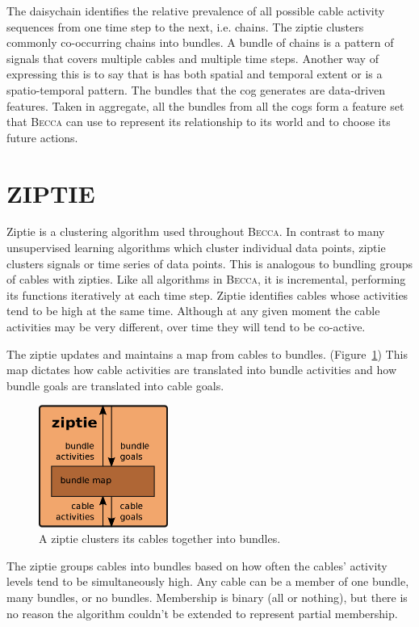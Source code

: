 \documentclass[oneside,twocolumn]{article}
\begin{document}
The daisychain identifies the relative prevalence of all possible cable activity sequences from one time step to the next, i.e. chains. The ziptie clusters commonly co-occurring chains into bundles. A bundle of chains is a pattern of signals that covers multiple cables and multiple time steps. Another way of expressing this is to say that is has both spatial and temporal extent or is a spatio-temporal pattern. The bundles that the cog generates are data-driven features. Taken in aggregate, all the bundles from all the cogs form a feature set that \textsc{Becca} can use to represent its relationship to its world and to choose its future actions. 

\section*{\color{copper} ZIPTIE}

Ziptie is a clustering algorithm used throughout \textsc{Becca}. In contrast to many unsupervised learning algorithms which cluster individual data points, ziptie clusters signals or time series of data points. This is analogous to bundling groups of cables with zipties. Like all algorithms in \textsc{Becca}, it is incremental, performing its functions iteratively at each time step. Ziptie identifies cables whose activities tend to be high at the same time. Although at any given moment the cable activities may be very different, over time they will tend to be co-active. 

The ziptie updates and maintains a map from cables to bundles. (Figure~\ref{ziptie}) This map dictates how cable activities are translated into bundle activities and how bundle goals are translated into cable goals. 

\begin{figure}[ht]
\centering
\includegraphics[height=4.0cm]{figs/ziptie.png}
\caption{A ziptie clusters its cables together into bundles.}
\label{ziptie}
\end{figure}

The ziptie groups cables into bundles based on how often the cables' activity levels tend to be simultaneously high. Any cable can be a member of one bundle, many bundles, or no bundles. Membership is binary (all or nothing), but there is no reason the algorithm couldn't be extended to represent partial membership.
\end{document}
